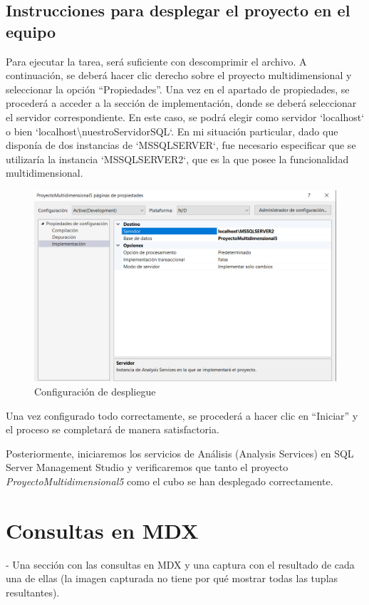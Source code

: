 \documentclass[12pt, a4paper, twoside]{article}
\begin{document}
	
	 \subsection{Instrucciones para desplegar el proyecto en el equipo}
	 
	 Para ejecutar la tarea, será suficiente con descomprimir el archivo. A continuación, se deberá hacer clic derecho sobre el proyecto multidimensional y seleccionar la opción ``Propiedades''. Una vez en el apartado de propiedades, se procederá a acceder a la sección de implementación, donde se deberá seleccionar el servidor correspondiente. En este caso, se podrá elegir como servidor `localhost` o bien `localhost\textbackslash nuestroServidorSQL`. En mi situación particular, dado que disponía de dos instancias de `MSSQLSERVER`, fue necesario especificar que se utilizaría la instancia `MSSQLSERVER2`, que es la que posee la funcionalidad multidimensional.
	 
	 \begin{figure}[H]
	 	\centering
	 	\includegraphics[width=1\textwidth]{image/despliegue}
	 	\caption{Configuración de despliegue}
	 	\label{fig:3}
	 \end{figure}
	 
	 Una vez configurado todo correctamente, se procederá a hacer clic en ``Iniciar'' y el proceso se completará de manera satisfactoria. 
	 
	Posteriormente, iniciaremos los servicios de Análisis (Analysis Services) en SQL Server Management Studio y verificaremos que tanto el proyecto \textit{ProyectoMultidimensional5} como el cubo se han desplegado correctamente.
	
	 
	
	\section{Consultas en MDX}
	- Una sección con las consultas en MDX y una captura con el resultado de cada una de ellas (la imagen capturada no tiene por qué mostrar todas las tuplas resultantes). 
	
\end{document}

